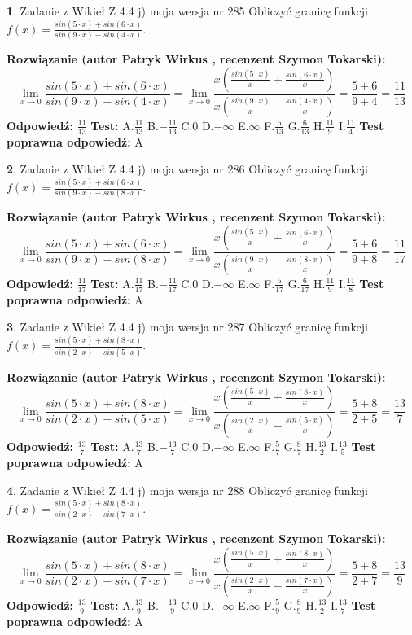 \documentclass[12pt, a4paper]{article}
\theoremstyle{definition} %
\newtheorem{zad}{}
\newcommand{\zadStart}[1]{\begin{zad}#1\newline}
\newcommand{\zadStop}{\end{zad}}
\newcommand{\rozwStart}[2]{\noindent \textbf{Rozwiązanie (autor #1 , recenzent #2): }\newline}
\newcommand{\rozwStop}{\newline}
\newcommand{\odpStart}{\noindent \textbf{Odpowiedź:}\newline}
\newcommand{\odpStop}{\newline}
\newcommand{\testStart}{\noindent \textbf{Test:}\newline}
\newcommand{\testStop}{\newline}
\newcommand{\kluczStart}{\noindent \textbf{Test poprawna odpowiedź:}\newline}
\newcommand{\kluczStop}{\newline}
\begin{document}
\zadStart{Zadanie z Wikieł Z 4.4 j) moja wersja nr 285}
Obliczyć granicę funkcji $f(x)=\frac{sin(5\cdot x) +sin(6\cdot x)}{sin(9\cdot x) -sin(4\cdot x)}$.
\zadStop
\rozwStart{Patryk Wirkus}{Szymon Tokarski}
$$\lim\limits_{x\to 0}\frac{sin(5\cdot x) +sin(6\cdot x)}{sin(9\cdot x) -sin(4\cdot x)}=\lim\limits_{x\to 0}\frac{x(\frac{sin(5\cdot x)}{x}+\frac{sin(6\cdot x)}{x})}{x(\frac{sin(9\cdot x)}{x}-\frac{sin(4\cdot x)}{x})}=\frac{5+6}{9+4} = \frac{11}{13}$$
\rozwStop
\odpStart
$\frac{11}{13}$
\odpStop
\testStart
A.$\frac{11}{13}$
B.$-\frac{11}{13}$
C.$0$
D.$-\infty$
E.$\infty$
F.$\frac{5}{13}$
G.$\frac{6}{13}$
H.$\frac{11}{9}$
I.$\frac{11}{4}$
\testStop
\kluczStart
A
\kluczStop



\zadStart{Zadanie z Wikieł Z 4.4 j) moja wersja nr 286}
Obliczyć granicę funkcji $f(x)=\frac{sin(5\cdot x) +sin(6\cdot x)}{sin(9\cdot x) -sin(8\cdot x)}$.
\zadStop
\rozwStart{Patryk Wirkus}{Szymon Tokarski}
$$\lim\limits_{x\to 0}\frac{sin(5\cdot x) +sin(6\cdot x)}{sin(9\cdot x) -sin(8\cdot x)}=\lim\limits_{x\to 0}\frac{x(\frac{sin(5\cdot x)}{x}+\frac{sin(6\cdot x)}{x})}{x(\frac{sin(9\cdot x)}{x}-\frac{sin(8\cdot x)}{x})}=\frac{5+6}{9+8} = \frac{11}{17}$$
\rozwStop
\odpStart
$\frac{11}{17}$
\odpStop
\testStart
A.$\frac{11}{17}$
B.$-\frac{11}{17}$
C.$0$
D.$-\infty$
E.$\infty$
F.$\frac{5}{17}$
G.$\frac{6}{17}$
H.$\frac{11}{9}$
I.$\frac{11}{8}$
\testStop
\kluczStart
A
\kluczStop



\zadStart{Zadanie z Wikieł Z 4.4 j) moja wersja nr 287}
Obliczyć granicę funkcji $f(x)=\frac{sin(5\cdot x) +sin(8\cdot x)}{sin(2\cdot x) -sin(5\cdot x)}$.
\zadStop
\rozwStart{Patryk Wirkus}{Szymon Tokarski}
$$\lim\limits_{x\to 0}\frac{sin(5\cdot x) +sin(8\cdot x)}{sin(2\cdot x) -sin(5\cdot x)}=\lim\limits_{x\to 0}\frac{x(\frac{sin(5\cdot x)}{x}+\frac{sin(8\cdot x)}{x})}{x(\frac{sin(2\cdot x)}{x}-\frac{sin(5\cdot x)}{x})}=\frac{5+8}{2+5} = \frac{13}{7}$$
\rozwStop
\odpStart
$\frac{13}{7}$
\odpStop
\testStart
A.$\frac{13}{7}$
B.$-\frac{13}{7}$
C.$0$
D.$-\infty$
E.$\infty$
F.$\frac{5}{7}$
G.$\frac{8}{7}$
H.$\frac{13}{2}$
I.$\frac{13}{5}$
\testStop
\kluczStart
A
\kluczStop



\zadStart{Zadanie z Wikieł Z 4.4 j) moja wersja nr 288}
Obliczyć granicę funkcji $f(x)=\frac{sin(5\cdot x) +sin(8\cdot x)}{sin(2\cdot x) -sin(7\cdot x)}$.
\zadStop
\rozwStart{Patryk Wirkus}{Szymon Tokarski}
$$\lim\limits_{x\to 0}\frac{sin(5\cdot x) +sin(8\cdot x)}{sin(2\cdot x) -sin(7\cdot x)}=\lim\limits_{x\to 0}\frac{x(\frac{sin(5\cdot x)}{x}+\frac{sin(8\cdot x)}{x})}{x(\frac{sin(2\cdot x)}{x}-\frac{sin(7\cdot x)}{x})}=\frac{5+8}{2+7} = \frac{13}{9}$$
\rozwStop
\odpStart
$\frac{13}{9}$
\odpStop
\testStart
A.$\frac{13}{9}$
B.$-\frac{13}{9}$
C.$0$
D.$-\infty$
E.$\infty$
F.$\frac{5}{9}$
G.$\frac{8}{9}$
H.$\frac{13}{2}$
I.$\frac{13}{7}$
\testStop
\kluczStart
A
\kluczStop
\end{document}
